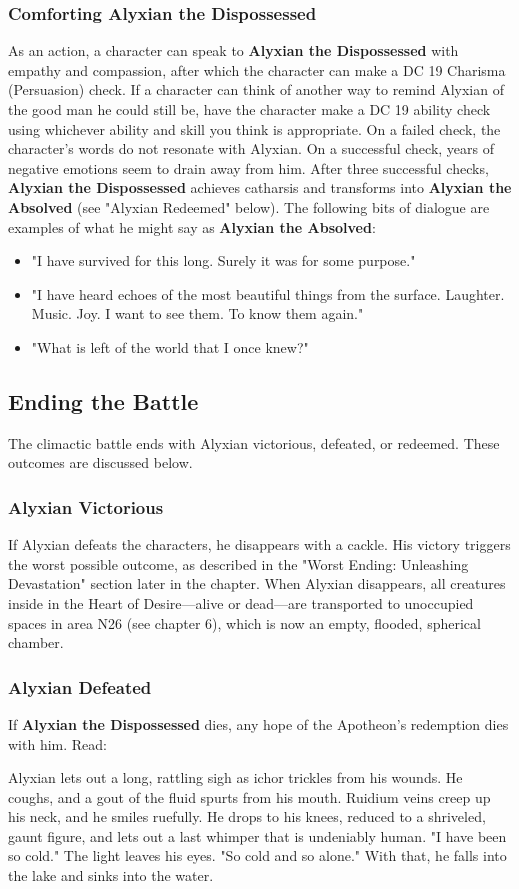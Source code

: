 \documentclass[10pt,a4,twoside,twocolumn,openany,nodeprecatedcode]{dndbook}
\begin{document}
\subsubsection{Comforting Alyxian the Dispossessed}
As an action, a character can speak to \textbf{Alyxian the Dispossessed} with empathy and compassion, after which the character can make a DC 19 Charisma (Persuasion) check. If a character can think of another way to remind Alyxian of the good man he could still be, have the character make a DC 19 ability check using whichever ability and skill you think is appropriate. On a failed check, the character's words do not resonate with Alyxian. On a successful check, years of negative emotions seem to drain away from him. After three successful checks, \textbf{Alyxian the Dispossessed} achieves catharsis and transforms into \textbf{Alyxian the Absolved} (see "Alyxian Redeemed" below).
The following bits of dialogue are examples of what he might say as \textbf{Alyxian the Absolved}:
\begin{itemize}

\item "I have survived for this long. Surely it was for some purpose."
\item "I have heard echoes of the most beautiful things from the surface. Laughter. Music. Joy. I want to see them. To know them again."
\item "What is left of the world that I once knew?"
\end{itemize}


\subsection{Ending the Battle}
The climactic battle ends with Alyxian victorious, defeated, or redeemed. These outcomes are discussed below.
\subsubsection{Alyxian Victorious}
If Alyxian defeats the characters, he disappears with a cackle. His victory triggers the worst possible outcome, as described in the "Worst Ending: Unleashing Devastation" section later in the chapter.
When Alyxian disappears, all creatures inside in the Heart of Desire—alive or dead—are transported to unoccupied spaces in area N26 (see chapter 6), which is now an empty, flooded, spherical chamber.
\subsubsection{Alyxian Defeated}
If \textbf{Alyxian the Dispossessed} dies, any hope of the Apotheon's redemption dies with him. Read:
\begin{DndReadAloud}{}
Alyxian lets out a long, rattling sigh as ichor trickles from his wounds. He coughs, and a gout of the fluid spurts from his mouth. Ruidium veins creep up his neck, and he smiles ruefully. He drops to his knees, reduced to a shriveled, gaunt figure, and lets out a last whimper that is undeniably human.
"I have been so cold." The light leaves his eyes. "So cold and so alone." With that, he falls into the lake and sinks into the water.
\end{DndReadAloud}
\end{document}
